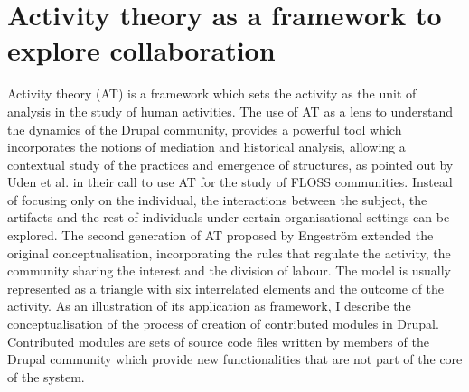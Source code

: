 \documentclass{acm_proc_article-sp}
\begin{document}
\section{Activity theory as a framework to explore collaboration}
Activity theory (AT) is a framework which sets the activity as the unit of analysis in the study of human activities. The use of AT as a lens to understand the dynamics of the Drupal community, provides a powerful tool which incorporates the notions of mediation and historical analysis, allowing a contextual study of the practices and emergence of structures, as pointed out by Uden et al.\cite{Uden2007} in their call to use AT for the study of FLOSS communities. Instead of focusing only on the individual, the interactions between the subject, the artifacts and the rest of individuals under certain organisational settings can be explored. The second generation of AT proposed by Engestr{\"o}m\cite{engestrom1987learning} extended the original conceptualisation, incorporating the rules that regulate the activity, the community sharing the interest and the division of labour. The model is usually represented as a triangle with six interrelated elements and the outcome of the activity. As an illustration of its application as framework, I describe the conceptualisation of the process of creation of contributed modules in Drupal. Contributed modules are sets of source code files written by members of the Drupal community which provide new functionalities that are not part of the core of the system.
\end{document}
